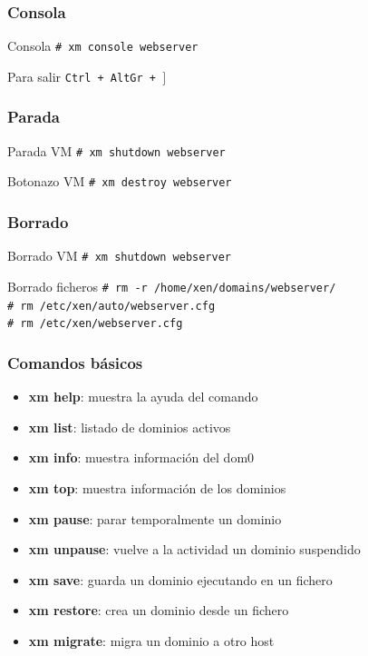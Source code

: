 \documentclass{beamer}
\begin{document}
\begin{frame}
  \frametitle{Consola}
  \begin{block}{Consola}
    \texttt{\# xm console webserver}
  \end{block}
  \bigskip
  Para salir \texttt{Ctrl + AltGr + $]$}
\end{frame}

\begin{frame}
  \frametitle{Parada}
  \begin{block}{Parada VM}
    \texttt{\# xm shutdown webserver}
  \end{block}
  \bigskip
  \begin{block}{Botonazo VM}
    \texttt{\# xm destroy webserver}
  \end{block}
\end{frame}

\begin{frame}
  \frametitle{Borrado}
  \begin{block}{Borrado VM}
    \texttt{\# xm shutdown webserver} \\
  \end{block}
  \bigskip
  \begin{block}{Borrado ficheros}
    \texttt{\# rm -r /home/xen/domains/webserver/} \\
    \texttt{\# rm /etc/xen/auto/webserver.cfg} \\
    \texttt{\# rm /etc/xen/webserver.cfg} \\
  \end{block}
\end{frame}

\begin{frame}
  \frametitle{Comandos básicos}
  \begin{itemize}
    \item \textbf{xm help}: muestra la ayuda del comando
    \item \textbf{xm list}: listado de dominios activos
    \item \textbf{xm info}: muestra información del dom0
    \item \textbf{xm top}: muestra información de los dominios
    \item \textbf{xm pause}: parar temporalmente un dominio
    \item \textbf{xm unpause}: vuelve a la actividad un dominio suspendido
    \item \textbf{xm save}: guarda un dominio ejecutando en un fichero
    \item \textbf{xm restore}: crea un dominio desde un fichero
    \item \textbf{xm migrate}: migra un dominio a otro host
  \end{itemize}
\end{frame}
\end{document}
